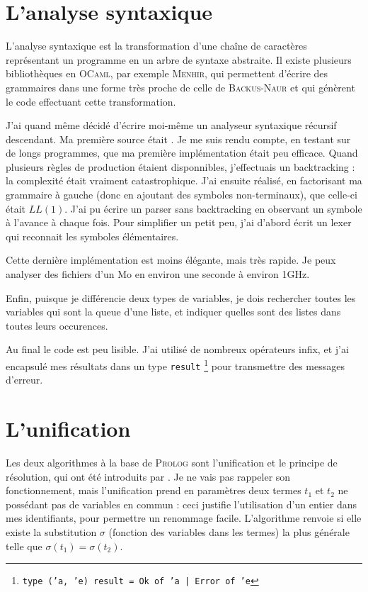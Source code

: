 \documentclass{article}
\begin{document}
\section{L'analyse syntaxique}

L'analyse syntaxique est la transformation d'une chaîne de caractères représentant un programme en un arbre de syntaxe abstraite. Il existe plusieurs bibliothèques en \textsc{OCaml}, par exemple \textsc{Menhir}, qui permettent d'écrire des grammaires dans une forme très proche de celle de \textsc{Backus-Naur} et qui génèrent le code effectuant cette transformation.

J'ai quand même décidé d'écrire moi-même un analyseur syntaxique récursif descendant. Ma première source était \cite{Ljunglof}. Je me suis rendu compte, en testant sur de longs programmes, que ma première implémentation était peu efficace. Quand plusieurs règles de production étaient disponnibles, j'effectuais un backtracking : la complexité était vraiment catastrophique. J'ai ensuite réalisé, en factorisant ma grammaire à gauche (donc en ajoutant des symboles non-terminaux), que celle-ci était $LL(1)$. J'ai pu écrire un parser sans backtracking en observant un symbole à l'avance à chaque fois. Pour simplifier un petit peu, j'ai d'abord écrit un lexer qui reconnait les symboles élémentaires.

Cette dernière implémentation est moins élégante, mais très rapide. Je peux analyser des fichiers d'un Mo en environ une seconde à environ 1GHz.

Enfin, puisque je différencie deux types de variables, je dois rechercher toutes les variables qui sont la queue d'une liste, et indiquer quelles sont des listes dans toutes leurs occurences.

Au final le code est peu lisible. J'ai utilisé de nombreux opérateurs infix, et j'ai encapsulé mes résultats dans un type \texttt{result}
\footnote{\texttt{type ('a, 'e) result = Ok of 'a | Error of 'e}}
 pour transmettre des messages d'erreur.

\section{L'unification}

Les deux algorithmes à la base de \textsc{Prolog} sont l'unification et le principe de résolution, qui ont été introduits par \cite{Robinson}. Je ne vais pas rappeler son fonctionnement, mais l'unification prend en paramètres deux termes $t_1$ et $t_2$ ne possédant pas de variables en commun : ceci justifie l'utilisation d'un entier dans mes identifiants, pour permettre un renommage facile. L'algorithme renvoie si elle existe la substitution $\sigma$ (fonction des variables dans les termes) la plus générale telle que $\sigma(t_1) = \sigma(t_2)$.
\end{document}
